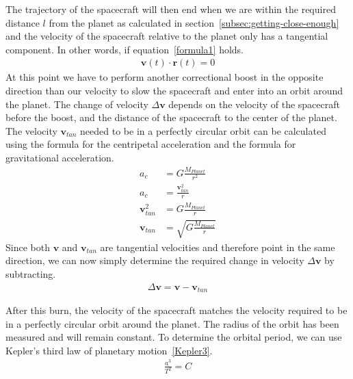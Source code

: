 \documentclass[reprint,english,notitlepage]{revtex4-2}
\begin{document}
    The trajectory of the spacecraft will then end when we are within the required distance $l$ from the planet as calculated in section~\ref{subsec:getting-close-enough} and the velocity of the spacecraft relative to the planet only has a tangential component.
    In other words, if equation~\eqref{formula1} holds.
    \begin{align}
        \textbf{v}(t) \cdot \textbf{r}(t) = 0 \label{formula1}
    \end{align}
    At this point we have to perform another correctional boost in the opposite direction than our velocity to slow the spacecraft and enter into an orbit around the planet.
    The change of velocity $\Delta \textbf{v}$ depends on the velocity of the spacecraft before the boost, and the distance of the spacecraft to the center of the planet.\\
    The velocity $\textbf{v}_{tan}$ needed to be in a perfectly circular orbit can be calculated using the formula for the centripetal acceleration and the formula for gravitational acceleration.
    \begin{align*}
        a_c &= G \frac{M_{Planet}}{r^2}\\
        a_c &= \frac{\textbf{v}_{tan}^2}{r}\\
        \textbf{v}_{tan}^2 &= G \frac{M_{Planet}}{r}\\
        \textbf{v}_{tan} &= \sqrt{G \frac{M_{Planet}}{r}}
    \end{align*}
    Since both $ \textbf{v}$ and $\textbf{v}_{tan}$ are tangential velocities and therefore point in the same direction, we can now simply determine the required change in velocity $\Delta \textbf{v}$ by subtracting.
    \begin{align*}
        \Delta \textbf{v} = \textbf{v} - \textbf{v}_{tan}
    \end{align*}

    After this burn, the velocity of the spacecraft matches the velocity required to be in a perfectly circular orbit around the planet.
    The radius of the orbit has been measured and will remain constant.
    To determine the orbital period, we can use Kepler's third law of planetary motion~\eqref{Kepler3}.
    \begin{align}
        \frac{a^3}{T^2} = C \label{Kepler3}
    \end{align}



\newpage
\end{document}
